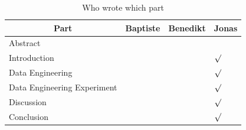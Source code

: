 \documentclass[a4paper]{article}
\begin{document}
\begin{table}
\caption{Who wrote which part}
\label{tbl:who}
\centering
\begin{tabular}{@{}llll@{}}
\toprule
\multicolumn{1}{c}{Part} & Baptiste   & Benedikt  & Jonas  \\ \midrule
Abstract                     			&   &  &  \\
Introduction                 			&   &  & $\surd$ \\
Data Engineering             			&   &  & $\surd$ \\
Data Engineering  Experiment          &   &  & $\surd$ \\
Discussion            					&   &  & $\surd$ \\
Conclusion           					&   &  & $\surd$ \\
 \bottomrule
\end{tabular}
\end{table}
\end{document}
